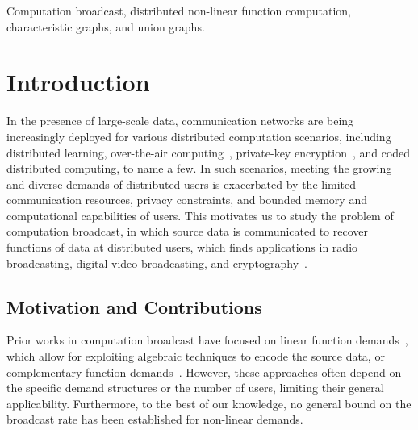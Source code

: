 \documentclass[conference, letterpaper]{IEEEtran} %
\begin{document}
\begin{IEEEkeywords}
Computation broadcast, distributed non-linear function computation, characteristic graphs, and union graphs.
\end{IEEEkeywords}



\section{Introduction}
\label{sec:intro}
In the presence of large-scale data, communication networks are being increasingly deployed for various distributed computation scenarios, including distributed learning\cite{predd2006distributed, 10129894}, over-the-air computing~\cite{csahin2023survey, montalban2021broadcast}, private-key encryption~\cite{kate2010distributed, liu2020privacy}, and coded distributed computing\cite{li2016coded, dutta2019optimal}, to name a few. 
In such scenarios, meeting the growing and diverse demands of distributed users is exacerbated by the limited communication resources, privacy constraints, and bounded memory and computational capabilities of users. 
This motivates us to study the problem of computation broadcast, in which source data is communicated to recover functions of data at distributed users, which finds applications in radio broadcasting, digital video broadcasting, and cryptography~\cite{chlebus2000deterministic, reimers1998digital, cryptoeprint:2024/154}.

\subsection{Motivation and Contributions}
\label{sec:motivation}
 
Prior works in computation broadcast have focused on linear function demands~\cite{ wan2021optimal,sun2019capacity, yao2024capacity, yao2024generic}, which allow for exploiting algebraic techniques to encode the source data, or complementary function demands~\cite{ravi2016broadcast}. However, these approaches often depend on the specific demand structures or the number of users, limiting their general applicability. Furthermore, to the best of our knowledge, no general bound on the broadcast rate has been established for non-linear demands.
\end{document}
